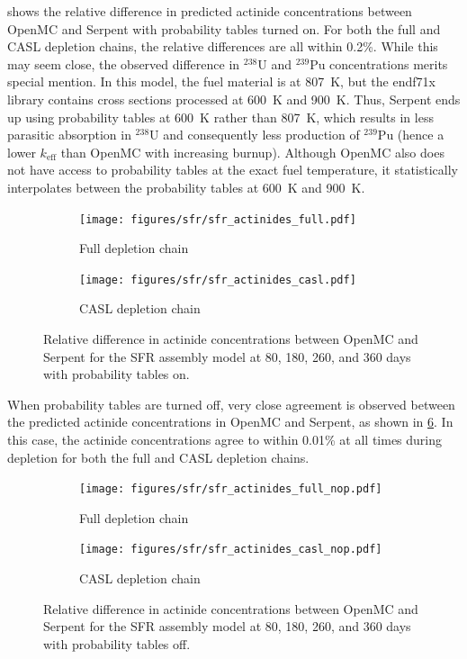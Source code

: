 \documentclass[3p,authoryear]{elsarticle}
\begin{document}
 shows the relative difference in predicted actinide
concentrations between OpenMC and Serpent with probability tables turned on. For
both the full and CASL depletion chains, the relative differences are all within
0.2\%. While this may seem close, the observed difference in $^{238}$U and
$^{239}$Pu concentrations merits special mention. In this model, the fuel
material is at \SI{807}{\kelvin}, but the endf71x library contains cross
sections processed at \SI{600}{\kelvin} and \SI{900}{\kelvin}. Thus, Serpent
ends up using probability tables at \SI{600}{\kelvin} rather than
\SI{807}{\kelvin}, which results in less parasitic absorption in $^{238}$U and
consequently less production of $^{239}$Pu (hence a lower $k_\text{eff}$ than
OpenMC with increasing burnup). Although OpenMC also does not have access to
probability tables at the exact fuel temperature, it statistically interpolates
between the probability tables at \SI{600}{\kelvin} and \SI{900}{\kelvin}.
\begin{figure}[H]
  \centering
  \begin{subfigure}[t]{0.45\textwidth}
    \texttt{[image: figures/sfr/sfr\_actinides\_full.pdf]}
    \caption{Full depletion chain}
    \label{fig:sfr-actinides-full}
  \end{subfigure}
  \hspace{0.05\textwidth}
  \begin{subfigure}[t]{0.45\textwidth}
    \texttt{[image: figures/sfr/sfr\_actinides\_casl.pdf]}
    \caption{CASL depletion chain}
    \label{fig:sfr-actinides-casl}
  \end{subfigure}
  \caption{Relative difference in actinide concentrations between OpenMC and
  Serpent for the SFR assembly model at 80, 180, 260, and 360 days with
  probability tables on.}
  \label{fig:sfr-actinides}
\end{figure}

When probability tables are turned off, very close agreement is observed between
the predicted actinide concentrations in OpenMC and Serpent, as shown in
\cref{fig:sfr-actinides-nop}. In this case, the actinide concentrations agree to
within 0.01\% at all times during depletion for both the full and CASL depletion
chains.
\begin{figure}[H]
  \centering
  \begin{subfigure}[t]{0.45\textwidth}
    \texttt{[image: figures/sfr/sfr\_actinides\_full\_nop.pdf]}
    \caption{Full depletion chain}
    \label{fig:sfr-actinides-full-nop}
  \end{subfigure}
  \hspace{0.05\textwidth}
  \begin{subfigure}[t]{0.45\textwidth}
    \texttt{[image: figures/sfr/sfr\_actinides\_casl\_nop.pdf]}
    \caption{CASL depletion chain}
    \label{fig:sfr-actinides-casl-nop}
  \end{subfigure}
  \caption{Relative difference in actinide concentrations between OpenMC and
  Serpent for the SFR assembly model at 80, 180, 260, and 360 days with
  probability tables off.}
  \label{fig:sfr-actinides-nop}
\end{figure}
\end{document}
